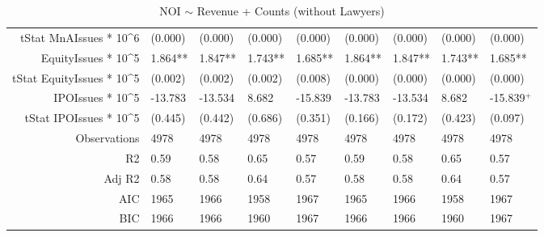 \begin{table}[ht]
\begin{tabular}{rllllllll}
  tStat MnAIssues * 10^6 & (0.000) & (0.000) & (0.000) & (0.000) & (0.000) & (0.000) & (0.000) & (0.000) \\ 
  EquityIssues * 10^5 & 1.864** & 1.847** & 1.743** & 1.685** & 1.864** & 1.847** & 1.743** & 1.685** \\ 
  tStat EquityIssues * 10^5 & (0.002) & (0.002) & (0.002) & (0.008) & (0.000) & (0.000) & (0.000) & (0.000) \\ 
  IPOIssues * 10^5 & -13.783 & -13.534 & 8.682 & -15.839 & -13.783 & -13.534 & 8.682 & -15.839$^{+}$ \\ 
  tStat IPOIssues * 10^5 & (0.445) & (0.442) & (0.686) & (0.351) & (0.166) & (0.172) & (0.423) & (0.097) \\ 
  Observations & 4978 & 4978 & 4978 & 4978 & 4978 & 4978 & 4978 & 4978 \\ 
  R2 & 0.59 & 0.58 & 0.65 & 0.57 & 0.59 & 0.58 & 0.65 & 0.57 \\ 
  Adj R2 & 0.58 & 0.58 & 0.64 & 0.57 & 0.58 & 0.58 & 0.64 & 0.57 \\ 
  AIC & 1965 & 1966 & 1958 & 1967 & 1965 & 1966 & 1958 & 1967 \\ 
  BIC & 1966 & 1966 & 1960 & 1967 & 1966 & 1966 & 1960 & 1967 \\ 
   \hline
\end{tabular}
\caption{NOI $\sim$ Revenue + Counts (without Lawyers)} 
\end{table}
